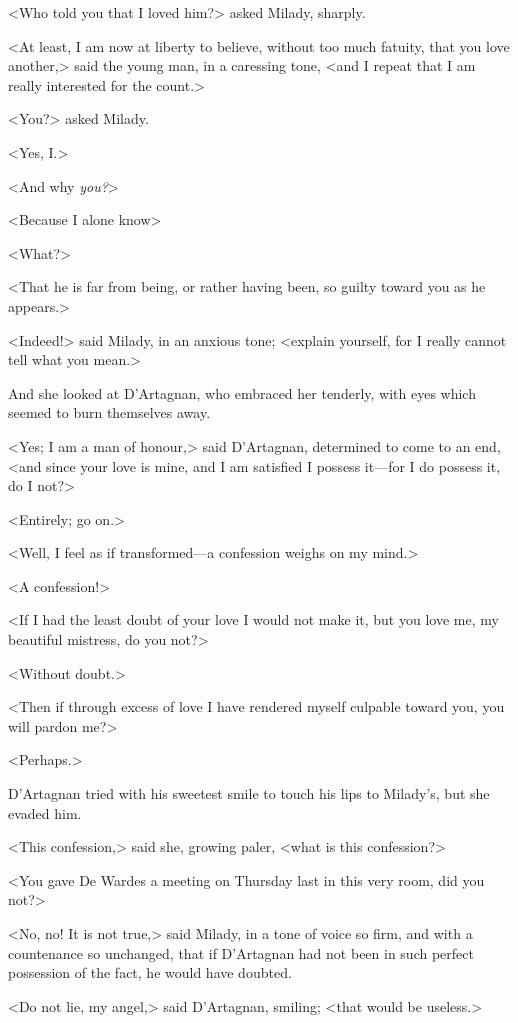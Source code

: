 <Who told you that I loved him?> asked Milady, sharply. 

<At least, I am now at liberty to believe, without too much fatuity, that you love another,> said the young man, in a caressing tone, <and I repeat that I am really interested for the count.> 

<You?> asked Milady. 

<Yes, I.> 

<And why \emph{you?}> 

<Because I alone know\longdash> 

<What?> 

<That he is far from being, or rather having been, so guilty toward you as he appears.> 

<Indeed!> said Milady, in an anxious tone; <explain yourself, for I really cannot tell what you mean.> 

And she looked at D'Artagnan, who embraced her tenderly, with eyes which seemed to burn themselves away. 

<Yes; I am a man of honour,> said D'Artagnan, determined to come to an end, <and since your love is mine, and I am satisfied I possess it—for I do possess it, do I not?> 

<Entirely; go on.> 

<Well, I feel as if transformed—a confession weighs on my mind.> 

<A confession!> 

<If I had the least doubt of your love I would not make it, but you love me, my beautiful mistress, do you not?> 

<Without doubt.> 

<Then if through excess of love I have rendered myself culpable toward you, you will pardon me?> 

<Perhaps.> 

D'Artagnan tried with his sweetest smile to touch his lips to Milady's, but she evaded him. 

<This confession,> said she, growing paler, <what is this confession?> 

<You gave De Wardes a meeting on Thursday last in this very room, did you not?> 

<No, no! It is not true,> said Milady, in a tone of voice so firm, and with a countenance so unchanged, that if D'Artagnan had not been in such perfect possession of the fact, he would have doubted. 

<Do not lie, my angel,> said D'Artagnan, smiling; <that would be useless.> 

